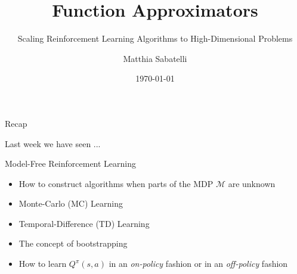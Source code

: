 \documentclass{beamer}
\title{Function Approximators}
\subtitle{Scaling Reinforcement Learning Algorithms to High-Dimensional Problems}
\author{Matthia Sabatelli}
\date{\today}
\begin{document}
\frame{\titlepage} 

\begin{frame}{Recap}

	Last week we have seen ...
	\begin{block}{Model-Free Reinforcement Learning}
		\begin{itemize}
			\item How to construct algorithms when parts of the MDP $\mathcal{M}$ are unknown
			\item Monte-Carlo (MC) Learning
			\item Temporal-Difference (TD) Learning
			\item The concept of bootstrapping
			\item How to learn $Q^{\pi}(s,a)$ in an \textit{on-policy} fashion or in an \textit{off-policy} fashion
		\end{itemize}
	\end{block}

\end{frame}






\end{document}
